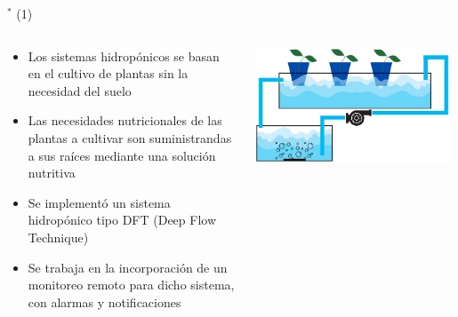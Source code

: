 
\begin{frame}{$^*$ (1)}
\begin{columns}
\begin{column}{0.75\textwidth}
	\begin{itemize}  %
        \item Los sistemas hidropónicos se basan en el cultivo de plantas sin la necesidad del suelo
        \item Las necesidades nutricionales de las plantas a cultivar son suministrandas a sus raíces mediante una solución nutritiva
		\item Se implementó un sistema hidropónico tipo DFT (Deep Flow Technique)
		\item Se trabaja en la incorporación de un monitoreo remoto para dicho sistema, con alarmas y notificaciones
	\end{itemize}
\end{column}
\begin{column}{0.25\textwidth}  
\includegraphics[width=0.98\textwidth]{2022_HidroponicosDavid/figs/dft}
\end{column}
\end{columns} 
\end{frame}


